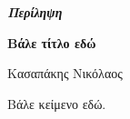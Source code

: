 \thispagestyle{plain}
\vspace*{\fill}
\begin{center}
    \LARGE
    \textit{\textbf{Περίληψη}}
        
    \vspace{0.4cm}
    \large
    \textbf{Βάλε τίτλο εδώ}
        
    \vspace{0.4cm}
    Κασαπάκης Νικόλαος
\end{center}
\normalsize

\vspace{0.9cm}

Βάλε κείμενο εδώ.

\vspace*{\fill}

